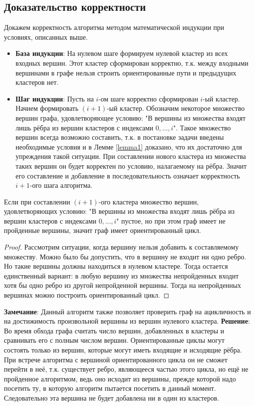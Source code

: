 \subsection{Доказательство корректности}
\label{sec:validalg}
Докажем корректность алгоритма методом математической индукции при условиях, описанных выше. 
\begin{itemize}
	\item \textbf{База индукции}: На нулевом шаге формируем нулевой кластер из всех входных вершин. Этот кластер сформирован корректно, т.к. между входными вершинами в графе нельзя строить ориентированные пути и предыдущих кластеров нет.
	\item \textbf{Шаг индукции}: Пусть на $i$-ом шаге корректно сформирован $i$-ый кластер. Начнем формировать $(i+1)$-ый кластер. Обозначим некоторое множество вершин графа, удовлетворяющее условию: "В вершины из множества входят лишь рёбра из вершин кластеров с индексами $0, \ldots, i$". Такое множество вершин всегда возможно составить, т.к. в постановке задачи введены необходимые условия и в Лемме \ref{lemma1} доказано, что их достаточно для упреждения такой ситуации. При составлении нового кластера из множества таких вершин он будет корректен по условию, налагаемому на рёбра. Значит его составление и добавление в последовательность означает корректность $i+1$-ого шага алгоритма.
\end{itemize}
\begin{lemma}\label{lemma1}
Если при составлении $(i+1)$-ого кластера множество вершин, удовлетворяющих условию: "В вершины из множества входят лишь рёбра из вершин кластеров с индексами $0, \ldots, i$" пустое, но при этом граф имеет не пройденные вершины, значит граф имеет ориентированный цикл.
\end{lemma}
\begin{proof}
Рассмотрим ситуации, когда вершину нельзя добавить к составляемому множеству. Можно было бы допустить, что в вершину не входит ни одно ребро. Но такие вершины должны находиться в нулевом кластере. Тогда остается единственный вариант: в любую вершину из множества непройденных входит хотя бы одно ребро из другой непройденной вершины. Тогда на непройденных вершинах можно построить ориентированный цикл.
\end{proof}
\textbf{Замечание}: Данный алгоритм также позволяет проверить граф на ацикличность и на достижимость произвольной вершины из вершин нулевого кластера. \newline
\textbf{Решение}: Во время обхода графа считать число вершин, добавленных в кластеры и сравнивать его с полным числом вершин. Ориентированные циклы могут состоять только из вершин, которые могут иметь входящие и исходящие рёбра. При встрече алгоритма с вершиной ориентированного цикла он не сможет перейти в неё, т.к. существует ребро, являющееся частью этого цикла, но ещё не пройденное алгоритмом, ведь оно исходит из вершины, прежде которой надо посетить ту, в которую алгоритм пытается посетить в данный момент. Следовательно эта вершина не будет добавлена ни в один из кластеров.

